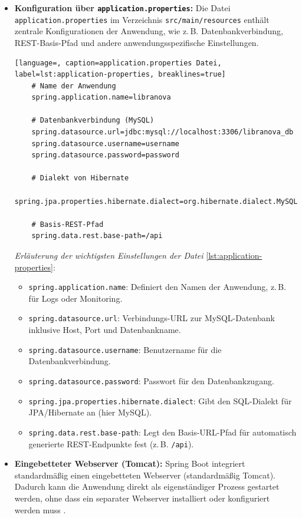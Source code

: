 \begin{itemize}
\item \textbf{Konfiguration über \texttt{application.properties}:} Die Datei \texttt{application.properties} im Verzeichnis \texttt{src/main/resources} enthält zentrale Konfigurationen der Anwendung, wie z.\,B. Datenbankverbindung, REST-Basis-Pfad und andere anwendungsspezifische Einstellungen.

\begin{lstlisting}[language=, caption=application.properties Datei, label=lst:application-properties, breaklines=true]
	# Name der Anwendung
	spring.application.name=libranova
	
	# Datenbankverbindung (MySQL)
	spring.datasource.url=jdbc:mysql://localhost:3306/libranova_db
	spring.datasource.username=username
	spring.datasource.password=password
	
	# Dialekt von Hibernate
	spring.jpa.properties.hibernate.dialect=org.hibernate.dialect.MySQLDialect
	
	# Basis-REST-Pfad
	spring.data.rest.base-path=/api
\end{lstlisting}

\textit{Erläuterung der wichtigsten Einstellungen der Datei} \ref{lst:application-properties}:
\begin{itemize}
	\item \texttt{spring.application.name}: Definiert den Namen der Anwendung, z.\,B. für Logs oder Monitoring.
	\item \texttt{spring.datasource.url}: Verbindungs-URL zur MySQL-Datenbank inklusive Host, Port und Datenbankname.
	\item \texttt{spring.datasource.username}: Benutzername für die Datenbankverbindung.
	\item \texttt{spring.datasource.password}: Passwort für den Datenbankzugang.
	\item \texttt{spring.jpa.properties.hibernate.dialect}: Gibt den SQL-Dialekt für JPA/Hibernate an (hier MySQL).
	\item \texttt{spring.data.rest.base-path}: Legt den Basis-URL-Pfad für automatisch generierte REST-Endpunkte fest (z.\,B. \texttt{/api}).
\end{itemize}

\item \textbf{Eingebetteter Webserver (Tomcat):} Spring Boot integriert standardmäßig einen eingebetteten Webserver (standardmäßig Tomcat). Dadurch kann die Anwendung direkt als eigenständiger Prozess gestartet werden, ohne dass ein separater Webserver installiert oder konfiguriert werden muss \cite{SPRINGBOOT2025b}.
\end{itemize}

